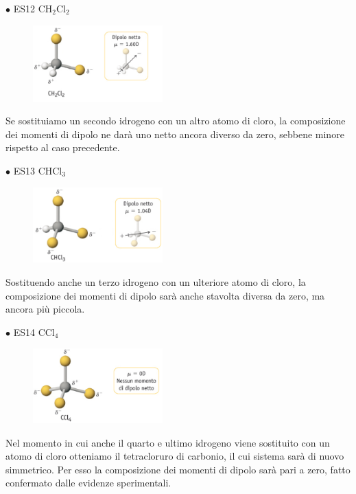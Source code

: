 \vspace{0.2cm}$\bullet$ ES12 CH$_2$Cl$_2$

\begin{minipage}{0.5\textwidth}
\begin{figure}[H]
\includegraphics[width=5cm]{immagini/CH_2Cl_2.png}
\end{figure}
\end{minipage} \hfill
\begin{minipage}{0.5\textwidth}
Se sostituiamo un secondo idrogeno con un altro atomo di cloro, la composizione dei momenti di dipolo ne darà uno netto ancora diverso da zero, sebbene minore rispetto al caso precedente.
\end{minipage}

\vspace{0.2cm}$\bullet$ ES13 CHCl$_3$

\begin{minipage}{0.5\textwidth}
\begin{figure}[H]
\includegraphics[width=5cm]{immagini/CHCl_3.png}
\end{figure}
\end{minipage} \hfill
\begin{minipage}{0.5\textwidth}
Sostituendo anche un terzo idrogeno con un ulteriore atomo di cloro, la composizione dei momenti di dipolo sarà anche stavolta diversa da zero, ma ancora più piccola.
\end{minipage}

\vspace{0.2cm}$\bullet$ ES14 CCl$_4$

\begin{minipage}{0.5\textwidth}
\begin{figure}[H]
\includegraphics[width=5cm]{immagini/CCl_4.png}
\end{figure}
\end{minipage} \hfill
\begin{minipage}{0.5\textwidth}
Nel momento in cui anche il quarto e ultimo idrogeno viene sostituito con un atomo di cloro otteniamo il tetracloruro di carbonio, il cui sistema sarà di nuovo simmetrico. Per esso la composizione dei momenti di dipolo sarà pari a zero, fatto confermato dalle evidenze sperimentali.
\end{minipage}


